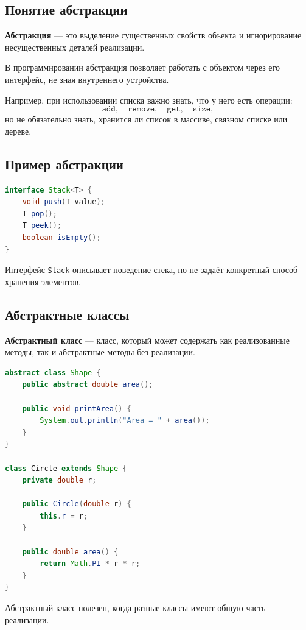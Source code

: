 \documentclass[12pt,a4paper]{article}
\begin{document}
\subsection{Понятие абстракции}

\textbf{Абстракция} --- это выделение существенных свойств объекта и игнорирование несущественных деталей реализации.

В программировании абстракция позволяет работать с объектом через его интерфейс, не зная внутреннего устройства.

Например, при использовании списка важно знать, что у него есть операции:
\[
\texttt{add}, \quad \texttt{remove}, \quad \texttt{get}, \quad \texttt{size},
\]
но не обязательно знать, хранится ли список в массиве, связном списке или дереве.

\subsection{Пример абстракции}

\begin{lstlisting}[language=Java,caption={Абстрактный тип данных}]
interface Stack<T> {
    void push(T value);
    T pop();
    T peek();
    boolean isEmpty();
}
\end{lstlisting}

Интерфейс \texttt{Stack} описывает поведение стека, но не задаёт конкретный способ хранения элементов.

\subsection{Абстрактные классы}

\textbf{Абстрактный класс} --- класс, который может содержать как реализованные методы, так и абстрактные методы без реализации.

\begin{lstlisting}[language=Java,caption={Абстрактный класс}]
abstract class Shape {
    public abstract double area();

    public void printArea() {
        System.out.println("Area = " + area());
    }
}

class Circle extends Shape {
    private double r;

    public Circle(double r) {
        this.r = r;
    }

    public double area() {
        return Math.PI * r * r;
    }
}
\end{lstlisting}

Абстрактный класс полезен, когда разные классы имеют общую часть реализации.
\end{document}
